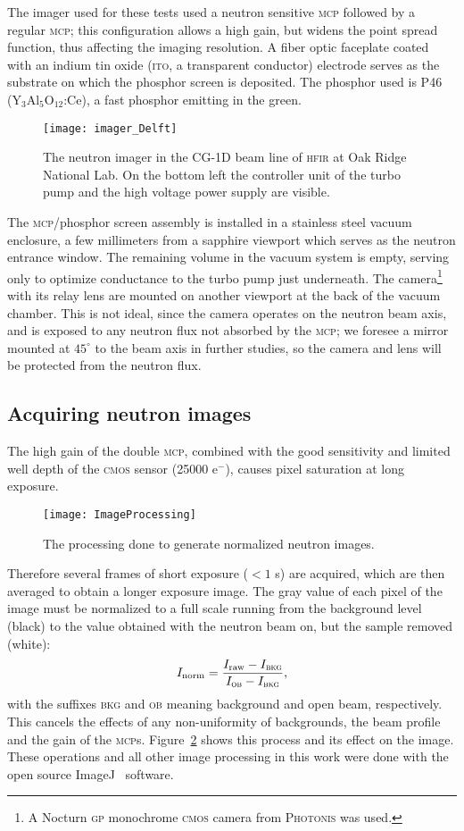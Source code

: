 \documentclass[a4paper,11pt]{article}
\begin{document}
The imager used for these tests used a neutron sensitive \textsc{mcp} followed by a regular \textsc{mcp}; this configuration allows a high gain, but widens the point spread function, thus affecting the imaging resolution.
A fiber optic faceplate coated with an indium tin oxide (\textsc{ito}, a transparent conductor) electrode serves as the substrate on which the phosphor screen is deposited.
The phosphor used is P46 (Y$_3$Al$_5$O$_{12}$:Ce), a fast phosphor emitting in the green.
 \begin{figure}[tb]
	\centering\texttt{[image: imager\_Delft]}
	\caption{The neutron imager in the CG-1D beam line of \textsc{hfir} at Oak Ridge National Lab. On the bottom left the controller unit of the turbo pump and the high voltage power supply are visible.\label{Delft}}
\end{figure}
The \textsc{mcp}/phosphor screen assembly is installed in a stainless steel vacuum enclosure, a few millimeters from a sapphire viewport which serves as the neutron entrance window.
The remaining volume in the vacuum system is empty, serving only to optimize conductance to the turbo pump just underneath.
The camera\footnote{A Nocturn \textsc{gp} monochrome \textsc{cmos} camera from \textsc{Photonis} was used.} with its relay lens are mounted on another viewport at the back of the vacuum chamber.
This is not ideal, since the camera operates on the neutron beam axis, and is exposed to any neutron flux not absorbed by the \textsc{mcp}; we foresee a mirror mounted at $45^\circ$ to the beam axis in further studies, so the camera and lens will be protected from the neutron flux.

\subsection{Acquiring neutron images}
The high gain of the double \textsc{mcp}, combined with the good sensitivity and limited well depth of the \textsc{cmos} sensor (25000 e$^-$), causes pixel saturation at long exposure.
\begin{figure}[tb]
	\centering\texttt{[image: ImageProcessing]}
	\caption{The processing done to generate normalized neutron images.\label{processing}}
\end{figure}
Therefore several frames of short exposure ($<1$ s) are acquired, which are then averaged to obtain a longer exposure image.
The gray value of each pixel of the image must be normalized to a full scale running from the background level (black) to the value obtained with the neutron beam on, but the sample removed (white):
\begin{equation}
I_\text{norm}=\frac{I_\text{raw}-I_\textsc{bkg}}{I_\textsc{ob}-I_\textsc{bkg}},
\end{equation}
with the suffixes \textsc{bkg} and \textsc{ob} meaning background and open beam, respectively.
This cancels the effects of any non-uniformity of backgrounds, the beam profile and the gain of the \textsc{mcp}s.
Figure~\ref{processing} shows this process and its effect on the image.
These operations and all other image processing in this work were done with the open source ImageJ~\cite{ImageJ} software.
\end{document}
